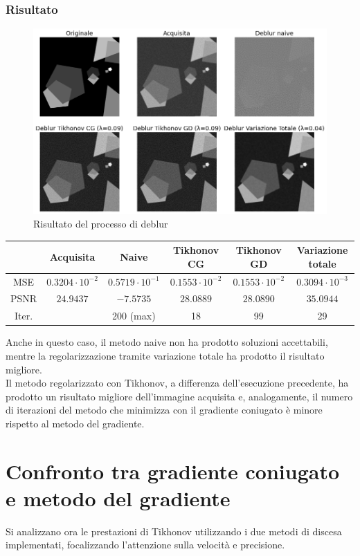 \documentclass[11pt]{article}
\begin{document}
\subsubsection{Risultato}
\begin{figure}[H]
    \centering
    \includegraphics[width=12cm]{esecuzione/2/deblur.png}
    \caption{Risultato del processo di deblur}
    \label{fig:deblur2}
\end{figure}

\begin{center}
    \begin{tabular}{ |c|c|c|c|c|c| }
    \hline
    & Acquisita & Naive & Tikhonov CG & Tikhonov GD & Variazione totale \\ 
    \hline
    MSE & $0.3204 \cdot 10^{-2}$ & $0.5719 \cdot 10^{-1}$ & $0.1553 \cdot 10^{-2}$ & $0.1553 \cdot 10^{-2}$ & $0.3094 \cdot 10^{-3}$ \\ 
    PSNR & $24.9437$ & $-7.5735$ & $28.0889$ & $28.0890$ & $35.0944$ \\ 
    Iter. & & 200 (max) & 18 & 99 & 29 \\ 
    \hline
    \end{tabular}
\end{center}

Anche in questo caso, il metodo naive non ha prodotto soluzioni accettabili, mentre la regolarizzazione tramite variazione totale ha prodotto il risultato migliore.\\
Il metodo regolarizzato con Tikhonov, a differenza dell'esecuzione precedente, ha prodotto un risultato migliore dell'immagine acquisita e, 
analogamente, il numero di iterazioni del metodo che minimizza con il gradiente coniugato è minore rispetto al metodo del gradiente.

\section{Confronto tra gradiente coniugato e metodo del gradiente}
\label{chap:confronto}
Si analizzano ora le prestazioni di Tikhonov utilizzando i due metodi di discesa implementati, focalizzando l'attenzione sulla velocità e precisione. \\
\end{document}
